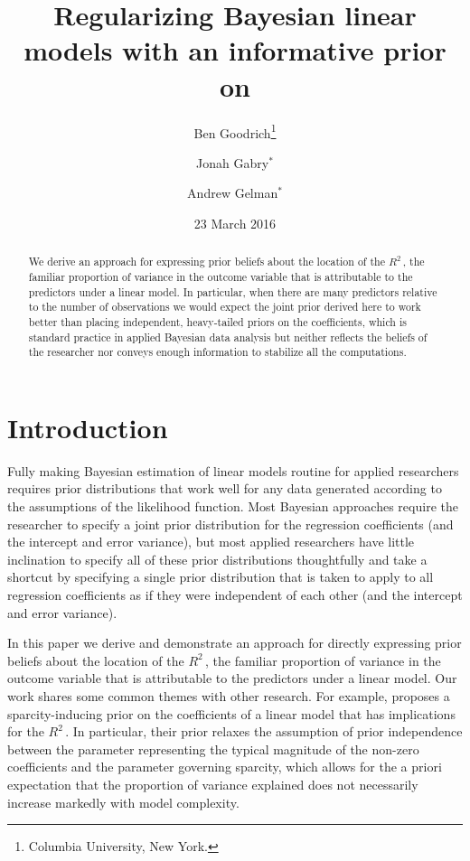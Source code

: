 \documentclass[11pt]{article}
\title{\bf Regularizing Bayesian linear models with an informative prior on \Rsq
    \vspace{.1in}}
\author{Ben Goodrich\footnote{Columbia University, New York.}
    \and Jonah Gabry$^\ast$
    \and Andrew Gelman$^\ast$
    \vspace{.1in}}
\date{23 March 2016
    \vspace{-.2in}}
\newcommand{\Rsq}{$R^2\,$}
\begin{document}
\maketitle
\thispagestyle{empty}

\begin{abstract}
\noindent We derive an approach for expressing prior beliefs about the location
of the \Rsq, the familiar proportion of variance in the outcome variable that is
attributable to the predictors under a linear model. In particular, when there
are many predictors relative to the number of observations we would expect the
joint prior derived here to work better than placing independent, heavy-tailed
priors on the coefficients, which is  standard practice in applied Bayesian data
analysis but neither reflects the beliefs of the researcher nor conveys enough
information to stabilize all the computations.
\end{abstract}


\section{Introduction}

Fully making Bayesian estimation of linear models routine for applied
researchers requires prior distributions that work well for any data generated
according to the assumptions of the likelihood function. Most Bayesian
approaches require the researcher to specify a joint prior distribution for the
regression coefficients (and the intercept and error variance), but most applied
researchers have little inclination to specify all of these prior distributions
thoughtfully and take a shortcut by specifying a single prior distribution that
is taken to apply to all regression coefficients as if they were independent of
each other (and the intercept and error variance).

In this paper we derive and demonstrate an approach for directly expressing
prior beliefs about the location of the \Rsq, the familiar proportion of
variance in the outcome variable that is attributable to the predictors under a
linear model. Our work shares some common themes with other research. For
example,  proposes a sparcity-inducing prior on the
coefficients of a linear model that has implications for the \Rsq. In
particular, their prior relaxes the assumption of prior independence between the
parameter representing the typical magnitude of the non-zero coefficients and
the parameter governing sparcity, which allows for the a priori expectation that
the proportion of variance explained does not necessarily increase markedly with
model complexity.
\end{document}
